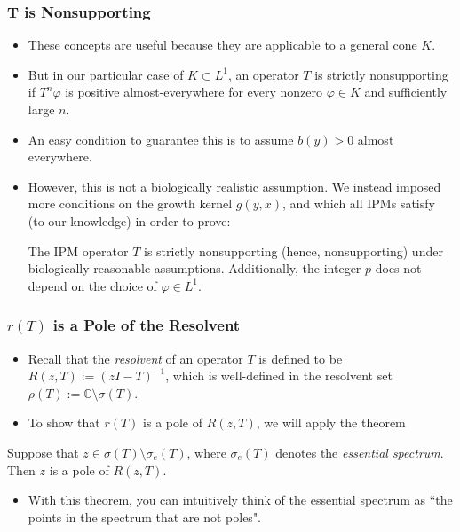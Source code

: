 \documentclass{beamer}
\newcommand{\C}{\mathbb{C}}
\begin{document}
\begin{frame}
	\frametitle{T is Nonsupporting}
	\begin{itemize}
		\item These concepts are useful because they are applicable to a general cone $K$.
		\pause
		\item But in our particular case of $K \subset L^1$, an operator $T$ is strictly nonsupporting if $T^n \varphi$ is positive almost-everywhere for every nonzero $\varphi \in K$ and sufficiently large $n$.
		\pause
		\item An easy condition to guarantee this is to assume $b(y) > 0$ almost everywhere.
		\pause
		\item However, this is not a biologically realistic assumption. We instead imposed more conditions on the growth kernel $g(y, x)$, and which all IPMs satisfy (to our knowledge) in order to prove:
		\pause
		\begin{theorem}
			The IPM operator $T$ is strictly nonsupporting (hence, nonsupporting) under biologically reasonable assumptions. Additionally, the integer $p$ does not depend on the choice of $\varphi \in L^1$.
		\end{theorem}
	\end{itemize}
\end{frame}

\begin{frame}
	\frametitle{$r(T)$ is a Pole of the Resolvent}
	\begin{itemize}
		\item Recall that the \emph{resolvent} of an operator $T$ is defined to be $R(z, T) := (zI - T)^{-1}$, which is well-defined in the resolvent set $\rho(T) := \C \setminus \sigma(T)$.
		\pause
		\item To show that $r(T)$ is a pole of $R(z, T)$, we will apply the theorem
	\end{itemize}
	\pause
	\begin{theorem}
		Suppose that $z \in \sigma(T) \setminus \sigma_e(T)$, where $\sigma_e(T)$ denotes the \emph{essential spectrum}. Then $z$ is a pole of $R(z, T)$.
	\end{theorem}
	\begin{itemize}
		\item With this theorem, you can intuitively think of the essential spectrum as ``the points in the spectrum that are not poles".
	\end{itemize}
\end{frame}
\end{document}
